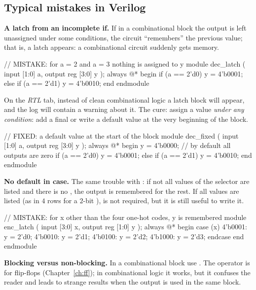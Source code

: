 \subsection{Typical mistakes in Verilog}

\textbf{A latch from an incomplete if.} If in a combinational block the
output is left unassigned under some conditions, the circuit ``remembers'' the
previous value; that is, a latch appears: a combinational circuit suddenly
gets memory.

\begin{vcode}
// MISTAKE: for a = 2 and a = 3 nothing is assigned to y
module dec_latch (
    input      [1:0] a,
    output reg [3:0] y
);
    always @* begin
        if (a == 2'd0)      y = 4'b0001;
        else if (a == 2'd1) y = 4'b0010;
    end
endmodule
\end{vcode}

On the \emph{RTL} tab, instead of clean combinational logic a latch
block will appear, and the log will contain a warning about it. The cure: assign a
value \emph{under any condition}: add a final  or write a
default value at the very beginning of the block.

\begin{vcode}
// FIXED: a default value at the start of the block
module dec_fixed (
    input      [1:0] a,
    output reg [3:0] y
);
    always @* begin
        y = 4'b0000;                       // by default all outputs are zero
        if (a == 2'd0)      y = 4'b0001;
        else if (a == 2'd1) y = 4'b0010;
    end
endmodule
\end{vcode}

\textbf{No default in case.} The same trouble with : if not all
values of the selector are listed and there is no , the output
is remembered for the rest. If all values are listed (as in $4$ rows for a
$2$-bit ),  is not required, but it is still useful to write it.

\begin{vcode}
// MISTAKE: for x other than the four one-hot codes, y is remembered
module enc_latch (
    input      [3:0] x,
    output reg [1:0] y
);
    always @* begin
        case (x)
            4'b0001: y = 2'd0;
            4'b0010: y = 2'd1;
            4'b0100: y = 2'd2;
            4'b1000: y = 2'd3;
        endcase
    end
endmodule
\end{vcode}

\textbf{Blocking versus non-blocking.} In a combinational 
block use \code{=}. The operator \code{<=} is for flip-flops
(Chapter~\ref{ch:ff}); in combinational logic it works, but it
confuses the reader and leads to strange results when the output is used in
the same block.

